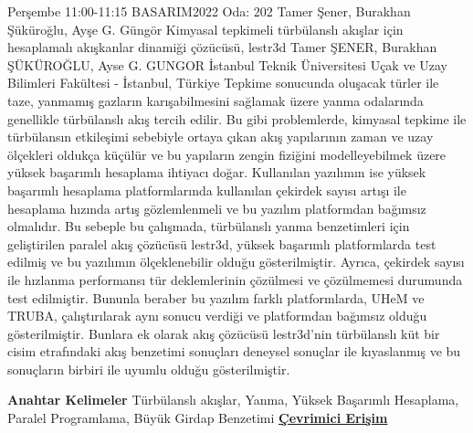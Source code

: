 
    \begin{abstract_basarim}
    {Perşembe 11:00-11:15}
    {BASARIM2022}
    {Oda: 202}
    {Tamer Şener, Burakhan Şüküroğlu, Ayşe G. Güngör}
    {Kimyasal tepkimeli türbülanslı akışlar için hesaplamalı akışkanlar dinamiği çözücüsü, lestr3d}
    {%
    Tamer ŞENER, Burakhan ŞÜKÜROĞLU, Ayse G. GUNGOR}
    {%
    }
    {%
    İstanbul Teknik Üniversitesi Uçak ve Uzay Bilimleri Fakültesi - İstanbul, Türkiye}
    Tepkime sonucunda oluşacak türler ile taze, yanmamış gazların karışabilmesini sağlamak üzere yanma odalarında genellikle türbülanslı akış tercih edilir. Bu gibi problemlerde, kimyasal tepkime ile türbülansın etkileşimi sebebiyle ortaya çıkan akış yapılarının zaman ve uzay ölçekleri oldukça küçülür ve bu yapıların zengin fiziğini modelleyebilmek üzere yüksek başarımlı hesaplama ihtiyacı doğar. Kullanılan yazılımın ise yüksek başarımlı hesaplama platformlarında kullanılan çekirdek sayısı artışı ile hesaplama hızında artış gözlemlenmeli ve bu yazılım platformdan bağımsız olmalıdır. Bu sebeple bu çalışmada, türbülanslı yanma benzetimleri için geliştirilen paralel akış çözücüsü lestr3d, yüksek başarımlı platformlarda test edilmiş ve bu yazılımın ölçeklenebilir olduğu gösterilmiştir. Ayrıca, çekirdek sayısı ile hızlanma performansı tür deklemlerinin çözülmesi ve çözülmemesi durumunda test edilmiştir. Bununla beraber bu yazılım farklı platformlarda, UHeM ve TRUBA, çalıştırılarak aynı sonucu verdiği ve platformdan bağımsız olduğu gösterilmiştir. Bunlara ek olarak akış çözücüsü lestr3d’nin türbülanslı küt bir cisim etrafındaki akış benzetimi sonuçları deneysel sonuçlar ile kıyaslanmış ve bu sonuçların birbiri ile uyumlu olduğu gösterilmiştir. 
    
            \textbf{Anahtar Kelimeler} \newline{}Türbülanslı akışlar, Yanma, Yüksek Başarımlı Hesaplama, Paralel Programlama, Büyük Girdap Benzetimi
     \newline\newline\noindent \href{https://drive.google.com/file/d/1ECkHHQJGgPhx9nL9mPXK6FDANBnI65UC/view?usp=drivesdk}{\bfseries Çevrimici Erişim}
    \end{abstract_basarim}
    